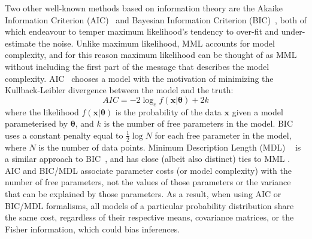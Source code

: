 \documentclass{elsarticle}
\newcommand{\vect}[1]{\boldsymbol{\mathbf{#1}}}
\renewcommand{\vec}[1]{\vect{#1}}
\begin{document}

Two other well-known methods based on information theory are the Akaike 
Information Criterion (AIC)~\cite{akaike1974} and Bayesian Information Criterion
(BIC)~\cite{schwarz1978estimating}, both of which endeavour to temper maximum 
likelihood's tendency to over-fit and under-estimate the noise. Unlike maximum
likelihood, MML accounts for model complexity, and for this reason maximum
likelihood can be thought of as MML without including the first part of the
message that describes the model complexity. AIC~\cite{akaike1974} chooses a 
model with the motivation of minimizing the Kullback-Leibler divergence 
between the model and the truth:
\begin{equation}
    AIC = -2 \log_{e}f(\vec{x} | \vec{\theta}) + 2 k
\end{equation}
\noindent{}where the likelihood $f(\vec{x} | \vec{\theta})$ is the probability 
of the data $\vec{x}$ given a model parameterised by $\vec{\theta}$, and $k$ 
is the number of free parameters in the model. BIC~\cite{schwarz1978estimating} 
uses a constant penalty equal to $\frac{1}{2}\log{N}$ for each free parameter in the 
model, where $N$ is the number of data points. Minimum Description Length (MDL)
~\cite{rissanen1978modeling} is a similar approach to BIC~\cite{schwarz1978estimating},
and has close (albeit also distinct) ties to MML \cite{WallaceBoulton1968}.
AIC and BIC/MDL associate parameter costs (or model complexity) with the number 
of free parameters, not the values of those parameters or the variance that
can be explained by those parameters. As a result, when using AIC or BIC/MDL
formalisms, all models of a particular probability distribution share the same
cost, regardless of their respective means, covariance matrices, or the
Fisher information, which could bias inferences.


\end{document}
